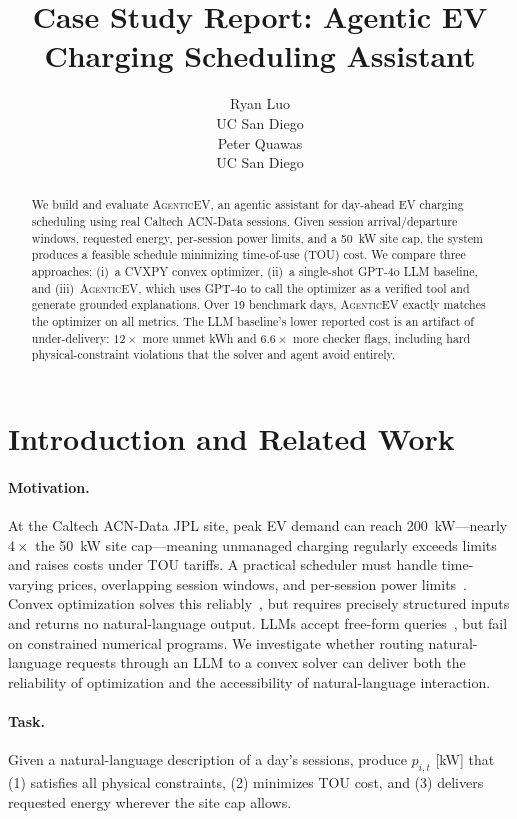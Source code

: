 \documentclass{article}
\title{Case Study Report: Agentic EV Charging Scheduling Assistant}
\author{
  Ryan Luo \\ UC San Diego \\ \And Peter Quawas \\ UC San Diego \\
}
\newcommand{\modelname}{\textsc{AgenticEV}}
\begin{document}
\maketitle
\small

\begin{abstract}
We build and evaluate \modelname{}, an agentic assistant for day-ahead EV charging scheduling using real Caltech ACN-Data sessions. Given session arrival/departure windows, requested energy, per-session power limits, and a 50~kW site cap, the system produces a feasible schedule minimizing time-of-use (TOU) cost. We compare three approaches: (i)~a CVXPY convex optimizer, (ii)~a single-shot GPT-4o LLM baseline, and (iii)~\modelname{}, which uses GPT-4o to call the optimizer as a verified tool and generate grounded explanations. Over 19 benchmark days, \modelname{} exactly matches the optimizer on all metrics. The LLM baseline's lower reported cost is an artifact of under-delivery: $12\times$ more unmet kWh and $6.6\times$ more checker flags, including hard physical-constraint violations that the solver and agent avoid entirely.
\end{abstract}

\section{Introduction and Related Work}

\paragraph{Motivation.}
At the Caltech ACN-Data JPL site, peak EV demand can reach 200~kW—nearly $4\times$ the 50~kW site cap—meaning unmanaged charging regularly exceeds limits and raises costs under TOU tariffs. A practical scheduler must handle time-varying prices, overlapping session windows, and per-session power limits~\cite{lee2020acn,wang2016survey}. Convex optimization solves this reliably~\cite{lee2020acn}, but requires precisely structured inputs and returns no natural-language output. LLMs accept free-form queries~\cite{brown2020language}, but fail on constrained numerical programs. We investigate whether routing natural-language requests through an LLM to a convex solver can deliver both the reliability of optimization and the accessibility of natural-language interaction.

\paragraph{Task.} Given a natural-language description of a day's sessions, produce $p_{i,t}$ [kW] that (1) satisfies all physical constraints, (2) minimizes TOU cost, and (3) delivers requested energy wherever the site cap allows.
\end{document}
